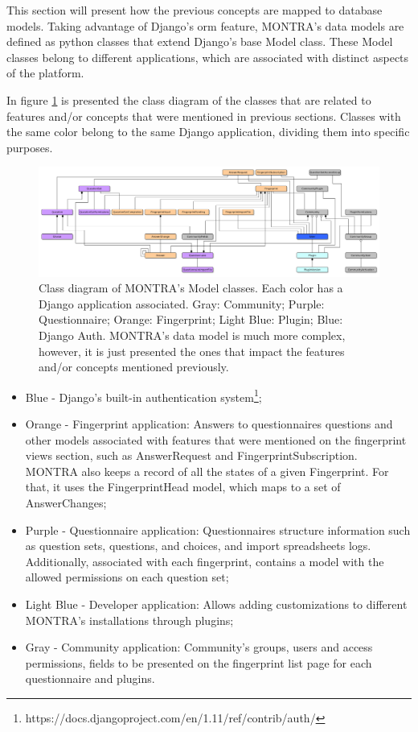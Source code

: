 This section will present how the previous concepts are mapped to database models.
Taking advantage of Django's \gls{orm} feature, MONTRA's data models are defined as python classes that extend Django's base Model class.
These Model classes belong to different applications, which are associated with distinct aspects of the platform.

In figure \ref{fig:old-models} is presented the class diagram of the classes that are related to features and/or concepts that were mentioned in previous sections.
Classes with the same color belong to the same Django application, dividing them into specific purposes.

\begin{figure}
    \includegraphics[width=\textwidth]{old-models}
    \caption{Class diagram of MONTRA's Model classes. Each color has a Django application associated. Gray: Community; Purple: Questionnaire; Orange: Fingerprint; Light Blue: Plugin; Blue: Django Auth. MONTRA's data model is much more complex, however, it is just presented the ones that impact the features and/or concepts mentioned previously.}
    \label{fig:old-models}
\end{figure}

\begin{itemize}
    \item Blue - Django's built-in authentication system\footnote{https://docs.djangoproject.com/en/1.11/ref/contrib/auth/};
    \item Orange - Fingerprint application: Answers to questionnaires questions and other models associated with features that were mentioned on the fingerprint views section, such as AnswerRequest and FingerprintSubscription.
        MONTRA also keeps a record of all the states of a given Fingerprint.
        For that, it uses the FingerprintHead model, which maps to a set of AnswerChanges;
    \item Purple - Questionnaire application: Questionnaires structure information such as question sets, questions, and choices, and import spreadsheets logs. Additionally, associated with each fingerprint, contains a model with the allowed permissions on each question set;
    \item Light Blue - Developer application: Allows adding customizations to different MONTRA's installations through plugins;
    \item Gray - Community application: Community's groups, users and access permissions, fields to be presented on the fingerprint list page for each questionnaire and plugins.
\end{itemize}

